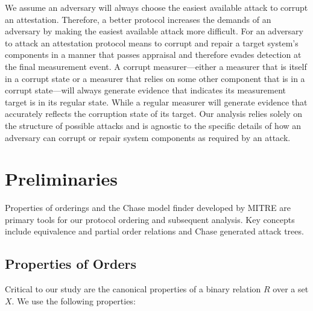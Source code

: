 \documentclass[runningheads]{llncs}
\theoremstyle{definition}
\begin{document}
We assume an adversary will always choose the easiest available attack
to corrupt an attestation. Therefore, a better protocol increases the
demands of an adversary by making the easiest available attack more
difficult. For an adversary to attack an attestation protocol means to
corrupt and repair a target system's components in a manner that
passes appraisal and therefore evades detection at the final
measurement event. A corrupt measurer---either a measurer that is
itself in a corrupt state or a measurer that relies on some other
component that is in a corrupt state---will always generate evidence
that indicates its measurement target is in its regular state. While a
regular measurer will generate evidence that accurately reflects the
corruption state of its target. Our analysis relies solely on the
structure of possible attacks and is agnostic to the specific details
of how an adversary can corrupt or repair system components as
required by an attack.





\section{Preliminaries}

Properties of orderings and the Chase model finder developed by MITRE
\cite{Ramsdell:2020:Chase} are primary tools for our protocol ordering
and subsequent analysis. Key concepts include equivalence and partial
order relations and Chase generated attack trees.

\subsection*{Properties of Orders}

Critical to our study are the canonical properties of a binary
relation $R$ over a set $X$. We use the following
properties:
\end{document}
